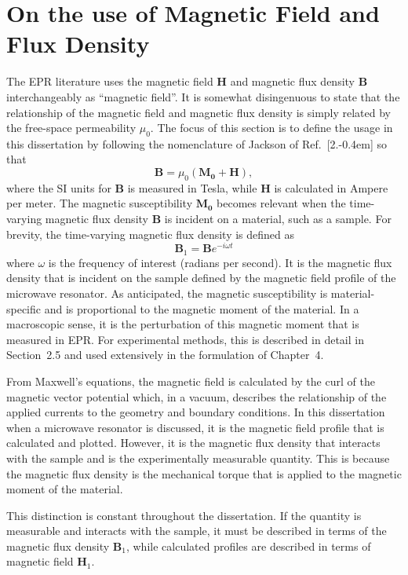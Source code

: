 \section{On the use of Magnetic Field and Flux Density}
The EPR literature uses the magnetic field $\mathbf{H}$ and magnetic flux density $\mathbf{B}$ interchangeably as ``magnetic field''. It is somewhat disingenuous to state that the relationship of the magnetic field and magnetic flux density is simply related by the free-space permeability $\mu_0$. The focus of this section is to define the usage in this dissertation by following the nomenclature of Jackson of Ref.~[2.\kern-0.4em] so that 
\begin{equation}
    \mathbf{B} = \mu_0(\mathbf{M_0} + \mathbf{H}),
\end{equation}
where the SI units for $\mathbf{B}$ is measured in Tesla, while $\mathbf{H}$ is calculated in Ampere per meter. The magnetic susceptibility $\mathbf{M_0}$ becomes relevant when the time-varying magnetic flux density $\mathbf{B}$ is incident on a material, such as a sample. For brevity, the time-varying magnetic flux density is defined as
\begin{equation}
    \mathbf{B}_1 = \mathbf{B} e^{-i\omega t}
\end{equation}
where $\omega$ is the frequency of interest (radians per second). It is the magnetic flux density that is incident on the sample defined by the magnetic field profile of the microwave resonator. As anticipated, the magnetic susceptibility is material-specific and is proportional to the magnetic moment of the material. In a macroscopic sense, it is the perturbation of this magnetic moment that is measured in EPR. For experimental methods, this is described in detail in Section~2.5 and used extensively in the formulation of Chapter~4. 

From Maxwell's equations, the magnetic field is calculated by the curl of the magnetic  vector potential which, in a vacuum, describes the relationship of the applied currents to the geometry and boundary conditions. \cite{jackson1975classical} In this dissertation when a microwave resonator is discussed, it is the magnetic field profile that is calculated and plotted. However, it is the magnetic flux density that interacts with the sample and is the experimentally measurable quantity. This is because the magnetic flux density is the mechanical torque that is applied to the magnetic moment of the material. 

This distinction is constant throughout the dissertation. If the quantity is measurable and interacts with the sample, it must be described in terms of the magnetic flux density $\mathbf{B}_1$, while calculated profiles are described in terms of magnetic field $\mathbf{H}_1$. 

